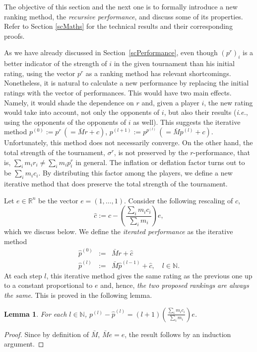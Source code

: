 \documentclass[a4paper,10pt]{article}
\newtheorem{lemma}[theorem]{Lemma}
\theoremstyle{remark}
\newcommand{\MM}{M} %
\newcommand{\rv}{r} %
\newcommand{\pv}{p} %
\begin{document}
The objective of this section and the next one is to
formally introduce a new ranking method, the \emph{recursive
performance}, and discuss some of its properties. Refer to Section
\ref{scMaths} for the technical results and their corresponding
proofs.

As we have already discussed in Section~\ref{scPerformance}, even
though $(\pv^r)_i$ is a better indicator of the strength of $i$ in
the given tournament than his initial rating, using the vector
$\pv^\rv$ as a ranking method has relevant shortcomings.
Nonetheless, it is natural to calculate a new performance by
replacing the initial ratings with the vector of performances. This
would have two main effects. Namely, it would shade the dependence
on $\rv$ and, given a player $i$, the new rating would take into
account, not only the opponents of $i$, but also their results
(\emph{i.e.}, using the opponents of the opponents of $i$ as
well). This suggests the iterative method $\pv^{(0)}:=\pv^\rv\,
(=\bar{\MM}\rv+c)$,
$\pv^{(l+1)}:=\pv^{\pv^{(l)}}\,(=\bar{\MM}\pv^{(l)}+c)$.
Unfortunately, this method does not necessarily converge. On the
other hand, the total strength of the tournament, $\sigma^\rv$, is not
preserved by the $\rv$-performance, that is, $\sum_i m_i \rv_i\neq \sum_i
m_i p^\rv_i$ in general. The inflation or deflation factor turns out
to be $\sum_i m_i c_i$. By distributing this factor among the
players, we define a new iterative method that does preserve the
total strength of the tournament.

Let $e\in\mathbb{R}^n$ be the vector $e=(1,\dots,1)$. Consider the
following rescaling of $c$,
\[
\hat{c}:=c-\left(\frac{\sum_i m_i c_i}{\sum_i m_i}\right)e,
\]
which we discuss below. We define the \emph{iterated performance}
as the iterative method
\[
\begin{array}{rcl}
\hat \pv^{(0)}&:=&\bar \MM \rv+\hat{c}\\[1ex]
\hat \pv^{(l)}&:=&\bar \MM \hat \pv^{(l-1)}+\hat{c},\quad
l\in\mathbb{N}.
\end{array}
\]
At each step $l$, this iterative method gives the same rating as the
previous one up to a constant proportional to $e$ and, hence,
\emph{the two proposed rankings are always the same}. This is
proved in the following lemma.

\begin{lemma}\label{order-not-changed}
For each $l\in\mathbb{N}$, $\pv^{(l)}-\hat
\pv^{(l)}=(l+1)\left(\frac{\sum_i m_i c_i}{\sum_i m_i}\right)e$.
\end{lemma}
\begin{proof}
Since by definition of $\bar{\MM}$, $\bar{\MM}e=e$, the result follows
by an induction argument.
\end{proof}
\end{document}
